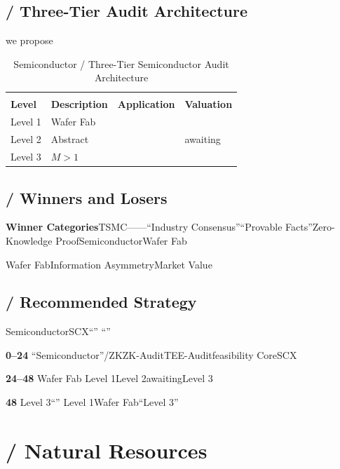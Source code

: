 \documentclass[12pt,a4paper]{article}
\theoremstyle{remark}
\begin{document}
\subsection{ / Three-Tier Audit Architecture}

we propose

\begin{table}[H]
\centering
\caption{Semiconductor / Three-Tier Semiconductor Audit Architecture}
\label{tab:semi_tiers}
\begin{tabular}{@{}p{2cm}p{5.5cm}p{3.5cm}p{3cm}@{}}
\toprule
\textbf{} & \textbf{} & \textbf{} & \textbf{} \\
\textbf{Level} & \textbf{Description} & \textbf{Application} & \textbf{Valuation} \\
\midrule
Level 1 & Wafer Fab &  &  \\
\addlinespace
Level 2 & Abstract &  & awaiting \\
\addlinespace
Level 3 & $M>1$ &  &  \\
\bottomrule
\end{tabular}
\end{table}

\subsection{ / Winners and Losers}

\textbf{Winner Categories}TSMC——``Industry Consensus''``Provable Facts''Zero-Knowledge ProofSemiconductorWafer Fab

\textbf{}Wafer FabInformation AsymmetryMarket Value

\subsection{ / Recommended Strategy}

SemiconductorSCX``''
``''

\textbf{0--24}
``Semiconductor''/ZKZK-AuditTEE-Auditfeasibility
CoreSCX

\textbf{24--48}
Wafer Fab
Level 1Level 2awaitingLevel 3

\textbf{48}
Level 3``''
Level 1Wafer Fab``Level 3''

\section{ / Natural Resources}
\end{document}
